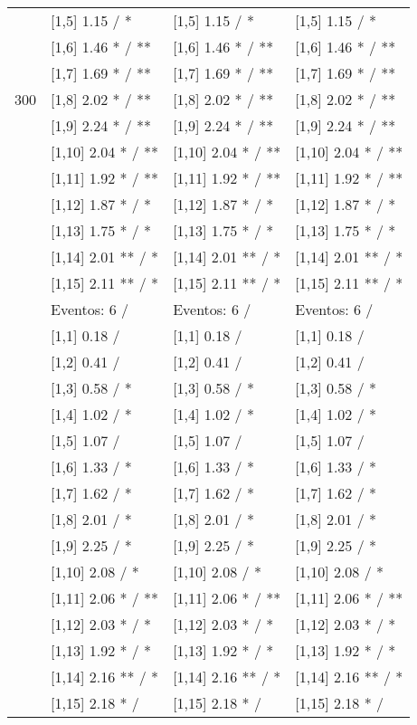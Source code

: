 \begin{table}
\begin{tabular}[t]{llll}
 & {}[1,5] 1.15  / * & {}[1,5] 1.15  / * & {}[1,5] 1.15  / *\\
 & {}[1,6] 1.46 * / ** & {}[1,6] 1.46 * / ** & {}[1,6] 1.46 * / **\\
 & {}[1,7] 1.69 * / ** & {}[1,7] 1.69 * / ** & {}[1,7] 1.69 * / **\\
300 & {}[1,8] 2.02 * / ** & {}[1,8] 2.02 * / ** & {}[1,8] 2.02 * / **\\
\addlinespace
 & {}[1,9] 2.24 * / ** & {}[1,9] 2.24 * / ** & {}[1,9] 2.24 * / **\\
 & {}[1,10] 2.04 * / ** & {}[1,10] 2.04 * / ** & {}[1,10] 2.04 * / **\\
 & {}[1,11] 1.92 * / ** & {}[1,11] 1.92 * / ** & {}[1,11] 1.92 * / **\\
 & {}[1,12] 1.87 * / * & {}[1,12] 1.87 * / * & {}[1,12] 1.87 * / *\\
 & {}[1,13] 1.75 * / * & {}[1,13] 1.75 * / * & {}[1,13] 1.75 * / *\\
\addlinespace
 & {}[1,14] 2.01 ** / * & {}[1,14] 2.01 ** / * & {}[1,14] 2.01 ** / *\\
 & {}[1,15] 2.11 ** / * & {}[1,15] 2.11 ** / * & {}[1,15] 2.11 ** / *\\
 & Eventos:  6 / & Eventos:  6 / & Eventos:  6 /\\
 & {}[1,1] 0.18  / & {}[1,1] 0.18  / & {}[1,1] 0.18  /\\
 & {}[1,2] 0.41  / & {}[1,2] 0.41  / & {}[1,2] 0.41  /\\
\addlinespace
 & {}[1,3] 0.58  / * & {}[1,3] 0.58  / * & {}[1,3] 0.58  / *\\
 & {}[1,4] 1.02  / * & {}[1,4] 1.02  / * & {}[1,4] 1.02  / *\\
 & {}[1,5] 1.07  / & {}[1,5] 1.07  / & {}[1,5] 1.07  /\\
 & {}[1,6] 1.33  / * & {}[1,6] 1.33  / * & {}[1,6] 1.33  / *\\
 & {}[1,7] 1.62  / * & {}[1,7] 1.62  / * & {}[1,7] 1.62  / *\\
\addlinespace
500 & {}[1,8] 2.01  / * & {}[1,8] 2.01  / * & {}[1,8] 2.01  / *\\
 & {}[1,9] 2.25  / * & {}[1,9] 2.25  / * & {}[1,9] 2.25  / *\\
 & {}[1,10] 2.08  / * & {}[1,10] 2.08  / * & {}[1,10] 2.08  / *\\
 & {}[1,11] 2.06 * / ** & {}[1,11] 2.06 * / ** & {}[1,11] 2.06 * / **\\
 & {}[1,12] 2.03 * / * & {}[1,12] 2.03 * / * & {}[1,12] 2.03 * / *\\
\addlinespace
 & {}[1,13] 1.92 * / * & {}[1,13] 1.92 * / * & {}[1,13] 1.92 * / *\\
 & {}[1,14] 2.16 ** / * & {}[1,14] 2.16 ** / * & {}[1,14] 2.16 ** / *\\
 & {}[1,15] 2.18 * / & {}[1,15] 2.18 * / & {}[1,15] 2.18 * /\\
\bottomrule
\end{tabular}
\end{table}
